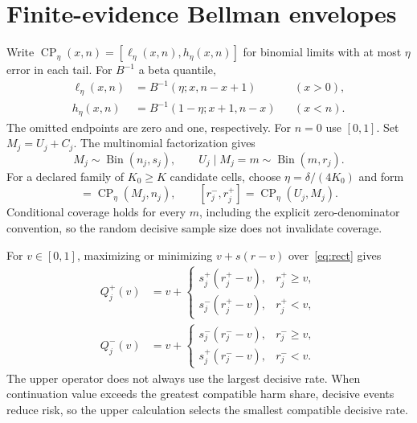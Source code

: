 \documentclass[10pt]{article}
\begin{document}
\section{Finite-evidence Bellman envelopes}\label{sec:envelope}
Write $\operatorname{CP}_\eta(x,n)=[\ell_\eta(x,n),h_\eta(x,n)]$ for binomial limits with at most $\eta$ error in each tail. For $B^{-1}$ a beta quantile,
\begin{align}
\ell_\eta(x,n)&=B^{-1}(\eta;x,n-x+1) &&(x>0),\\
h_\eta(x,n)&=B^{-1}(1-\eta;x+1,n-x) &&(x<n).
\end{align}
The omitted endpoints are zero and one, respectively. For $n=0$ use $[0,1]$. Set $M_j=U_j+C_j$. The multinomial factorization gives
\begin{equation}
M_j\sim\operatorname{Bin}(n_j,s_j),\qquad
U_j\mid M_j=m\sim\operatorname{Bin}(m,r_j).\label{eq:binomial}
\end{equation}
For a declared family of $K_0\geq K$ candidate cells, choose $\eta=\delta/(4K_0)$ and form
\begin{equation}
[s_j^-,s_j^+]=\operatorname{CP}_\eta(M_j,n_j),\qquad
[r_j^-,r_j^+]=\operatorname{CP}_\eta(U_j,M_j).\label{eq:rect}
\end{equation}
Conditional coverage holds for every $m$, including the explicit zero-denominator convention, so the random decisive sample size does not invalidate coverage.

For $v\in[0,1]$, maximizing or minimizing $v+s(r-v)$ over~\eqref{eq:rect} gives
\begin{align}
Q_j^+(v)&=v+\begin{cases}s_j^+(r_j^+-v),&r_j^+\geq v,\\s_j^-(r_j^+-v),&r_j^+<v,\end{cases}\label{eq:upper}\\
Q_j^-(v)&=v+\begin{cases}s_j^-(r_j^--v),&r_j^-\geq v,\\s_j^+(r_j^--v),&r_j^-<v.\end{cases}\label{eq:lower}
\end{align}
The upper operator does not always use the largest decisive rate. When continuation value exceeds the greatest compatible harm share, decisive events reduce risk, so the upper calculation selects the smallest compatible decisive rate.
\end{document}
